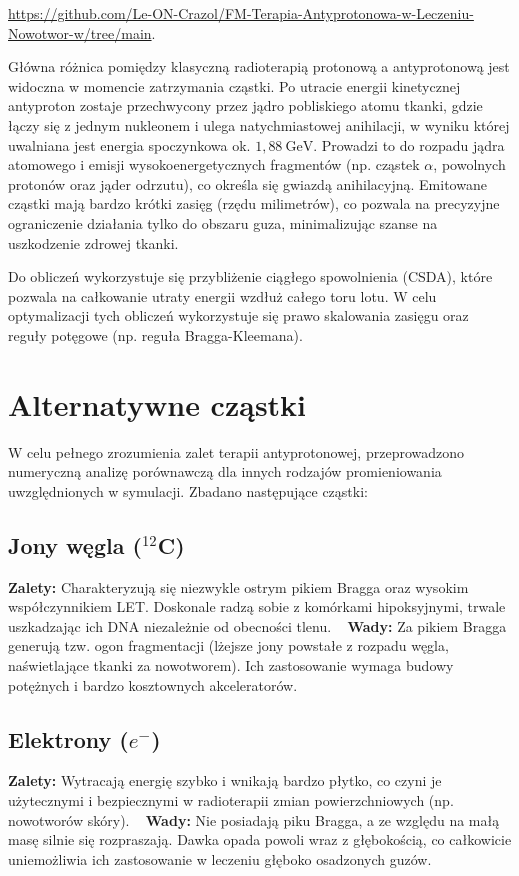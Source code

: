 \documentclass{article}
\begin{document}
\url{https://github.com/Le-ON-Crazol/FM-Terapia-Antyprotonowa-w-Leczeniu-Nowotwor-w/tree/main}.

Główna różnica pomiędzy klasyczną radioterapią protonową a antyprotonową jest widoczna w momencie zatrzymania cząstki. Po utracie energii kinetycznej antyproton zostaje przechwycony przez jądro pobliskiego atomu tkanki, gdzie łączy się z jednym nukleonem i ulega natychmiastowej anihilacji, w wyniku której uwalniana jest energia spoczynkowa ok. $1{,}88~\mathrm{GeV}$. Prowadzi to do rozpadu jądra atomowego i emisji wysokoenergetycznych fragmentów (np. cząstek $\alpha$, powolnych protonów oraz jąder odrzutu), co określa się gwiazdą anihilacyjną. Emitowane cząstki mają bardzo krótki zasięg (rzędu milimetrów), co pozwala na precyzyjne ograniczenie działania tylko do obszaru guza, minimalizując szanse na uszkodzenie zdrowej tkanki.

Do obliczeń wykorzystuje się przybliżenie ciągłego spowolnienia (CSDA), które pozwala na całkowanie utraty energii wzdłuż całego toru lotu. W celu optymalizacji tych obliczeń wykorzystuje się prawo skalowania zasięgu oraz reguły potęgowe (np. reguła Bragga-Kleemana).

\section{Alternatywne cząstki}

W celu pełnego zrozumienia zalet terapii antyprotonowej, przeprowadzono numeryczną analizę porównawczą dla innych rodzajów promieniowania uwzględnionych w symulacji. Zbadano następujące cząstki:


\subsection{Jony węgla ($^{12}$C)}
\textbf{Zalety:} Charakteryzują się niezwykle ostrym pikiem Bragga oraz wysokim współczynnikiem LET. Doskonale radzą sobie z komórkami hipoksyjnymi, trwale uszkadzając ich DNA niezależnie od obecności tlenu. \
\newline
\textbf{Wady:} Za pikiem Bragga generują tzw. ogon fragmentacji (lżejsze jony powstałe z rozpadu węgla, naświetlające tkanki za nowotworem). Ich zastosowanie wymaga budowy potężnych i bardzo kosztownych akceleratorów.

\subsection{Elektrony ($e^-$)}
\textbf{Zalety:} Wytracają energię szybko i wnikają bardzo płytko, co czyni je użytecznymi i bezpiecznymi w radioterapii zmian powierzchniowych (np. nowotworów skóry). \
\newline
\textbf{Wady:} Nie posiadają piku Bragga, a ze względu na małą masę silnie się rozpraszają. Dawka opada powoli wraz z głębokością, co całkowicie uniemożliwia ich zastosowanie w leczeniu głęboko osadzonych guzów.
\end{document}
